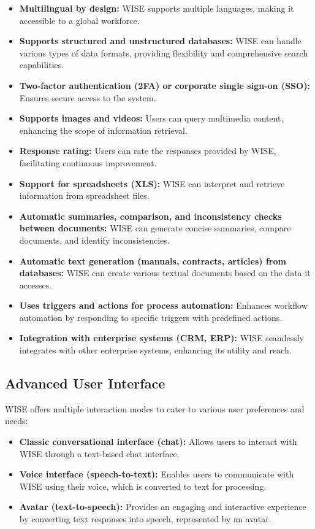 \begin{itemize}
    \item \textbf{Multilingual by design:} WISE supports multiple languages, making it accessible to a global workforce.
    \item \textbf{Supports structured and unstructured databases:} WISE can handle various types of data formats, providing flexibility and comprehensive search capabilities.
    \item \textbf{Two-factor authentication (2FA) or corporate single sign-on (SSO):} Ensures secure access to the system.
    \item \textbf{Supports images and videos:} Users can query multimedia content, enhancing the scope of information retrieval.
    \item \textbf{Response rating:} Users can rate the responses provided by WISE, facilitating continuous improvement.
    \item \textbf{Support for spreadsheets (XLS):} WISE can interpret and retrieve information from spreadsheet files.
    \item \textbf{Automatic summaries, comparison, and inconsistency checks between documents:} WISE can generate concise summaries, compare documents, and identify inconsistencies.
    \item \textbf{Automatic text generation (manuals, contracts, articles) from databases:} WISE can create various textual documents based on the data it accesses.
    \item \textbf{Uses triggers and actions for process automation:} Enhances workflow automation by responding to specific triggers with predefined actions.
    \item \textbf{Integration with enterprise systems (CRM, ERP):} WISE seamlessly integrates with other enterprise systems, enhancing its utility and reach.
\end{itemize}

\subsection{Advanced User Interface}

WISE offers multiple interaction modes to cater to various user preferences and needs:

\begin{itemize}
    \item \textbf{Classic conversational interface (chat):} Allows users to interact with WISE through a text-based chat interface.
    \item \textbf{Voice interface (speech-to-text):} Enables users to communicate with WISE using their voice, which is converted to text for processing.
    \item \textbf{Avatar (text-to-speech):} Provides an engaging and interactive experience by converting text responses into speech, represented by an avatar.
\end{itemize}


